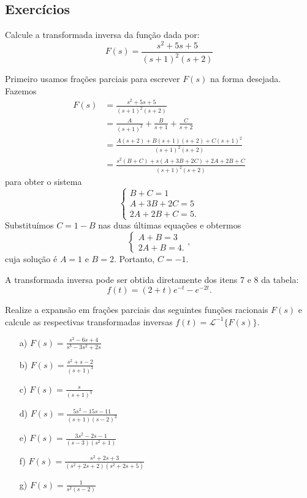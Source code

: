 \subsection*{Exercícios}
\begin{exeresol}
  Calcule a transformada inversa da função dada por:
  $$F(s)=\frac{s^2+5s+5}{(s+1)^2(s+2)}$$
\end{exeresol}
\begin{resol}
  Primeiro usamos frações parciais para escrever $F(s)$ na forma desejada. Fazemos
  \begin{align*}
  F(s)&=\frac{s^2+5s+5}{(s+1)^2(s+2)}\\
  &=\frac{A}{(s+1)^2}+\frac{B}{s+1}+\frac{C}{s+2}\\
  &=\frac{A(s+2)+B(s+1)(s+2)+C(s+1)^2}{(s+1)^2(s+2)} \\
  &=\frac{s^2(B+C)+s(A+3B+2C)+2A+2B+C }{(s+1)^2(s+2)}
  \end{align*}
  para obter o sistema
  $$\left\{\begin{array}{l}
     B+C=1\\
     A+3B+2C=5\\
     2A+2B+C=5.
    \end{array}\right.
  $$
  Substituímos $C=1-B$ nas duas últimas equações e obtermos
  $$\left\{\begin{array}{l}
     A+B=3\\
     2A+B=4.
    \end{array}\right.,
  $$
  cuja solução é $A=1$ e $B=2$. Portanto, $C=-1$.

  A transformada inversa pode ser obtida diretamente dos itens 7 e 8 da tabela:
  $$f(t)=(2+t)e^{-t}-e^{-2t}.$$
\end{resol}
\begin{exer}{\label{frac_parciais}} Realize a expansão em frações parciais das seguintes funções racionais $F(s)$ e calcule as respectivas transformadas inversas $f(t)=\mathcal{L}^{-1}\{F(s)\}$.
\begin{itemize}
\item[a)]$F(s)=\frac{s^2-6s+4}{s^3-3s^2+2s}$
\item[b)]$F(s)=\frac{s^2+s-2}{(s+1)^3}$
\item[c)]$F(s)=\frac{s}{(s+1)^3}$
\item[d)]$F(s)=\frac{5s^2-15s-11}{(s+1)(s-2)^3}$
\item[e)]$F(s)=\frac{3s^2-2s-1}{(s-3)(s^2+1)}$
\item[f)]$F(s)=\frac{s^2+2s+3}{(s^2+2s+2)(s^2+2s+5)}$
\item[g)]$F(s)=\frac{1}{s^2(s-2)}$
\end{itemize}
\end{exer}

